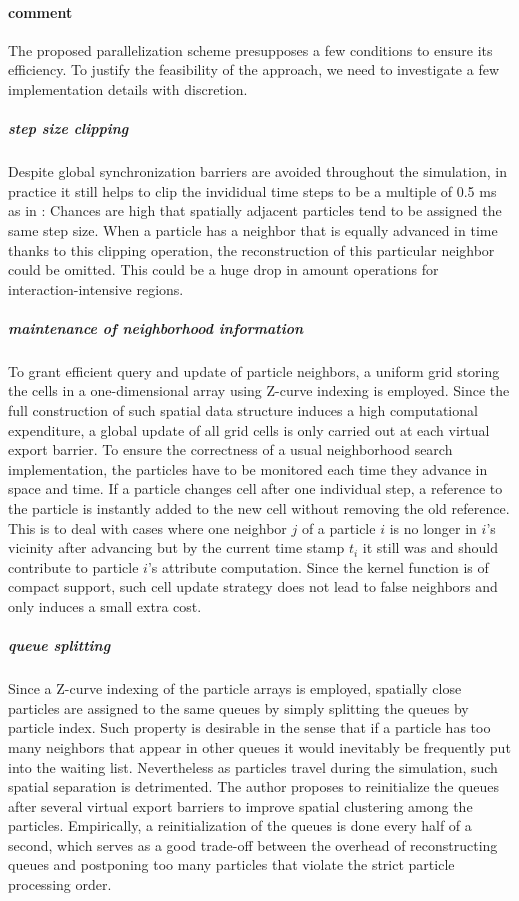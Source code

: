 \documentclass[
	11pt, 
	DIV10,
	ngerman,
	a4paper, 
	oneside, 
	headings=normal, 
	captions=tableheading,
	final, 
	numbers=noenddot
]{scrartcl}
\begin{document}
\paragraph{comment}
The proposed parallelization scheme presupposes a few conditions to ensure its efficiency. To justify the feasibility of the approach, we need to investigate a few implementation details with discretion.

\subparagraph{step size clipping}
Despite global synchronization barriers are avoided throughout the simulation, in practice it still helps to clip the invididual time steps to be a multiple of 0.5 ms as in \cite{goswami2014regional}: Chances are high that spatially adjacent particles tend to be assigned the same step size. When a particle has a neighbor that is equally advanced in time thanks to this clipping operation, the reconstruction of this particular neighbor could be omitted. This could be a huge drop in amount operations for interaction-intensive regions.

\subparagraph{maintenance of neighborhood information}
To grant efficient query and update of particle neighbors, a uniform grid storing the cells in a one-dimensional array using Z-curve indexing is employed. Since the full construction of such spatial data structure induces a high computational expenditure, a global update of all grid cells is only carried out at each virtual export barrier. To ensure the correctness of a usual neighborhood search implementation, the particles have to be monitored each time they advance in space and time. If a particle changes cell after one individual step, a reference to the particle is instantly added to the new cell without removing the old reference. This is to deal with cases where one neighbor $j$ of a particle $i$ is no longer in $i$'s vicinity after advancing but by the current time stamp $t_{i}$ it still was and should contribute to particle $i$'s attribute computation. Since the kernel function is of compact support, such cell update strategy does not lead to false neighbors and only induces a small extra cost.

\subparagraph{queue splitting}
Since a Z-curve indexing of the particle arrays is employed, spatially close particles are assigned to the same queues by simply splitting the queues by particle index. Such property is desirable in the sense that if a particle has too many neighbors that appear in other queues it would inevitably be frequently put into the waiting list. Nevertheless as particles travel during the simulation, such spatial separation is detrimented. The author proposes to reinitialize the queues after several virtual export barriers to improve spatial clustering among the particles. Empirically, a reinitialization of the queues is done every half of a second, which serves as a good trade-off between the overhead of reconstructing queues and postponing too many particles that violate the strict particle processing order.
\end{document}
